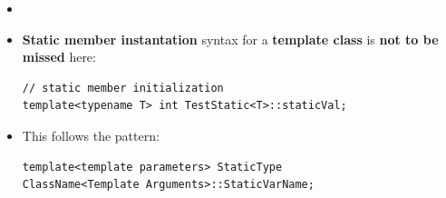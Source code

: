\documentclass[10pt]{article}
\begin{document}
\begin{itemize}
\begin{itemize}
    \item This means that a \verb|static| member in a template class is not shared across all possible template types; instead, it is shared only among objects that use the \textbf{same template instantiation}.

    \item For example, \verb|MyClass<int>| and \verb|MyClass<double>| are treated as two separate classes by the compiler. Therefore, each one receives its own independent copy of the static member variable.

    \item If a template class contains a static member \verb|X|, then all objects of \verb|MyClass<int>| share the same \verb|X_int|, while all objects of \verb|MyClass<double>| share a separate \verb|X_double|.

    \item Conceptually, the compiler creates separate versions of the static member for each type:
    \begin{itemize}
        \item \verb|X_int| for the \verb|int| template instantiation.
        \item \verb|X_double| for the \verb|double| template instantiation.
    \end{itemize}

    \item Thus, static members in templates are \textbf{shared within each template instantiation}, but are \textbf{independent between different template instantiations}.
\end{itemize}

\item {}

\end{itemize}

\begin{tcolorbox}
	\begin{itemize}
		\item \textbf{Static member instantation} syntax for a \textbf{template class} is \textbf{not to be missed} here:
		\begin{verbatim}
// static member initialization
template<typename T> int TestStatic<T>::staticVal;
		\end{verbatim}

	\item This follows the pattern:

		\begin{verbatim}
template<template parameters> StaticType
ClassName<Template Arguments>::StaticVarName;
		\end{verbatim}
	\end{itemize}
\end{tcolorbox}
\end{document}
